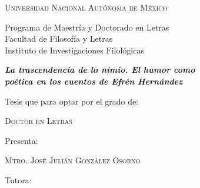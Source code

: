 \documentclass[14pt,twoside,final]{extbook} %
\begin{document}
\setcounter{page}{1}
\parindent=5mm %
\parskip=0mm %
\newpage
\pagestyle{empty}
\protect{}
{}
\BgThispage
\hspace*{0pt}
\vspace*{18pt}
\begin{center}
\large\scshape Universidad Nacional Autónoma de México
\end{center}
\begin{center}
\large Programa de Maestría y Doctorado en Letras \\

Facultad de Filosofía y Letras \\

Instituto de Investigaciones Filológicas
\end{center}
\smallskip
\begin{center}
\large\itshape\bfseries La trascendencia de lo nimio. El humor como \\ poética en los cuentos de Efrén Hernández
\end{center}
\smallskip
\begin{center}
\large Tesis que para optar por el grado de:
\end{center}
\begin{center}
\large\scshape Doctor en Letras
\end{center}
\begin{center}
\large Presenta:
\end{center}
\begin{center}
\large\scshape Mtro. José Julián González Osorno
\end{center}
\begin{center}
\large Tutora:
\end{center}
\end{document}
